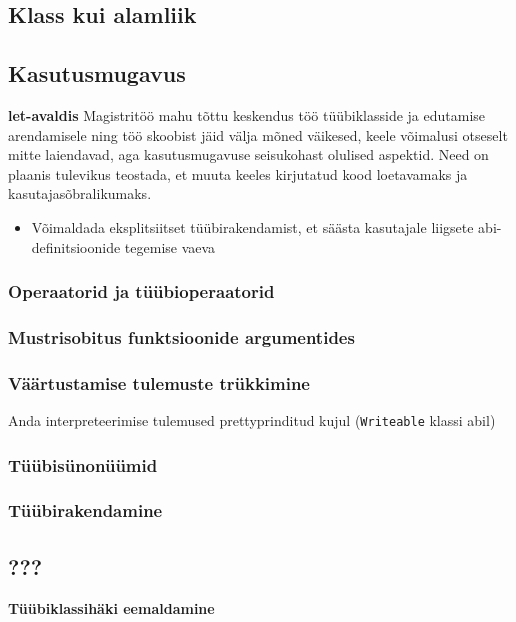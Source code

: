 \documentclass[12pt]{article}
\newcommand\markus[1]{\textcolor{roheline}{\textbf{#1}}}
\begin{document}
    \subsection{Klass kui alamliik}
      
    \subsection{Kasutusmugavus}
      \markus{let-avaldis} Magistritöö mahu tõttu keskendus töö tüübiklasside ja edutamise arendamisele ning töö skoobist jäid välja mõned väikesed, keele võimalusi otseselt mitte laiendavad, aga kasutusmugavuse seisukohast olulised aspektid. Need on plaanis tulevikus teostada, et muuta keeles kirjutatud kood loetavamaks ja kasutajasõbralikumaks.
      \begin{itemize}
        \item
          Võimaldada eksplitsiitset tüübirakendamist, et säästa kasutajale liigsete abi-definitsioonide tegemise vaeva
      \end{itemize}
      \subsubsection{Operaatorid ja tüübioperaatorid}
        
      \subsubsection{Mustrisobitus funktsioonide argumentides}
        
      \subsubsection{Väärtustamise tulemuste trükkimine}
        Anda interpreteerimise tulemused prettyprinditud kujul (\verb!Writeable! klassi abil)
      \subsubsection{Tüübisünonüümid}
        
      \subsubsection{Tüübirakendamine}
        
    \subsection{???}
      \markus{Tüübiklassihäki eemaldamine}
\end{document}
